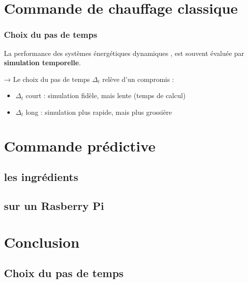 \section{Commande de chauffage classique}

\begin{frame}
  \frametitle{Choix du pas de temps}
  
  La performance des systèmes énergétiques dynamiques
  ,
  est souvent évaluée par \textbf{simulation temporelle}.
  
  \bigskip
  
  → Le choix du pas de temps $\Delta_t$ relève d'un compromis :
  \begin{itemize}
    \item $\Delta_t$ court : simulation fidèle, mais lente (temps de calcul)
    \item $\Delta_t$ long : simulation plus rapide, mais plus grossière
  \end{itemize}

\end{frame}

\section{Commande prédictive}
\subsection{les ingrédients}
\subsection{sur un Rasberry Pi}

\section{Conclusion}

\subsection{Choix du pas de temps}


